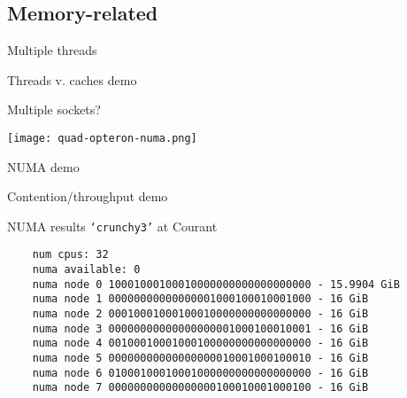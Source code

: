 \documentclass[english,compress]{beamer}
\begin{document}
\subsection{Memory-related}
\begin{frame}{Multiple threads}
  \begin{center}
  \Huge Threads v. caches demo
  \end{center}
\end{frame}
\begin{frame}{Multiple sockets?}
  \begin{center}
    \texttt{[image: quad-opteron-numa.png]}
  \end{center}
  \uncover<+->{}
\end{frame}
\begin{frame}{NUMA demo}
  \begin{center}
  \Huge Contention/throughput demo
  \end{center}
\end{frame}
\begin{frame}[fragile]{NUMA results}
  \texttt{`crunchy3'} at Courant

  \medskip
  \begin{lstlisting}
    num cpus: 32
    numa available: 0
    numa node 0 10001000100010000000000000000000 - 15.9904 GiB
    numa node 1 00000000000000001000100010001000 - 16 GiB
    numa node 2 00010001000100010000000000000000 - 16 GiB
    numa node 3 00000000000000000001000100010001 - 16 GiB
    numa node 4 00100010001000100000000000000000 - 16 GiB
    numa node 5 00000000000000000010001000100010 - 16 GiB
    numa node 6 01000100010001000000000000000000 - 16 GiB
    numa node 7 00000000000000000100010001000100 - 16 GiB
  \end{lstlisting}
\end{frame}
\end{document}
